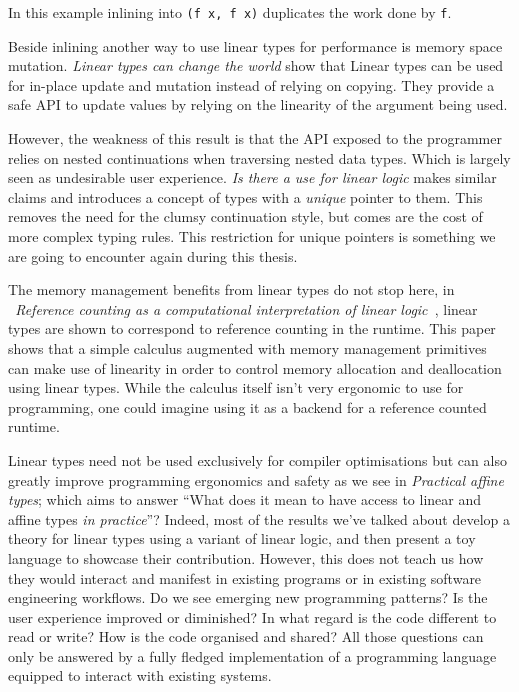 \documentclass[
]{article}
\begin{document}
In this example inlining into \texttt{(f\ x,\ f\ x)} duplicates the work
done by \texttt{f}.

Beside inlining another way to use linear types for performance is
memory space mutation. \emph{Linear types can change the
world}\cite{linear_types_update} show that Linear types can be used for
in-place update and mutation instead of relying on copying. They provide
a safe API to update values by relying on the linearity of the argument
being used.

However, the weakness of this result is that the API exposed to the
programmer relies on nested continuations when traversing nested data
types. Which is largely seen as undesirable user experience. \emph{Is
there a use for linear logic}\cite{linear_use} makes similar claims and
introduces a concept of types with a \emph{unique} pointer to them. This
removes the need for the clumsy continuation style, but comes are the
cost of more complex typing rules. This restriction for unique pointers
is something we are going to encounter again during this thesis.

The memory management benefits from linear types do not stop here, in
\emph{~Reference counting as a computational interpretation of linear
logic~}\cite{linear_ref_count}, linear types are shown to correspond to
reference counting in the runtime. This paper shows that a simple
calculus augmented with memory management primitives can make use of
linearity in order to control memory allocation and deallocation using
linear types. While the calculus itself isn't very ergonomic to use for
programming, one could imagine using it as a backend for a reference
counted runtime.

Linear types need not be used exclusively for compiler optimisations but
can also greatly improve programming ergonomics and safety as we see in
\emph{Practical affine types}\cite{affine_types}; which aims to answer
``What does it mean to have access to linear and affine types \emph{in
practice}''? Indeed, most of the results we've talked about develop a
theory for linear types using a variant of linear logic, and then
present a toy language to showcase their contribution. However, this
does not teach us how they would interact and manifest in existing
programs or in existing software engineering workflows. Do we see
emerging new programming patterns? Is the user experience improved or
diminished? In what regard is the code different to read or write? How
is the code organised and shared? All those questions can only be
answered by a fully fledged implementation of a programming language
equipped to interact with existing systems.
\end{document}
